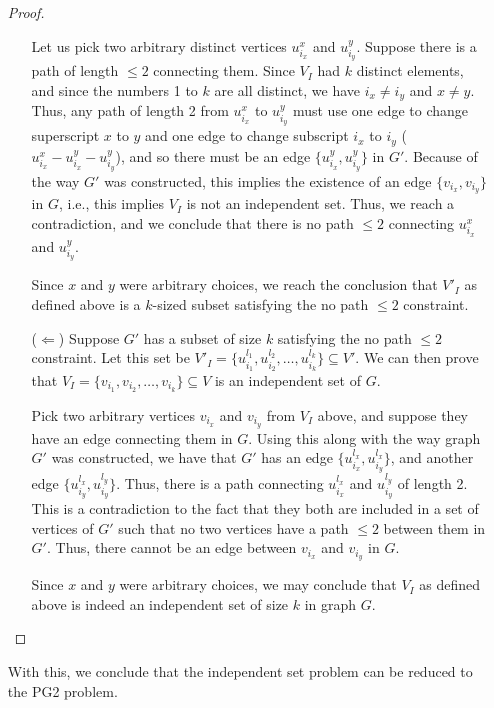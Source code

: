 \documentclass[11pt, fleqn]{article}
\begin{document}
\begin{itemize}
\begin{proof}
\begin{itemize}
            Let us pick two arbitrary distinct vertices $u_{i_x}^x$ and $u_{i_y}^y$. Suppose there is a path of length $\leq 2$ connecting them. Since $V_I$ had $k$ distinct elements, and since the numbers 1 to $k$ are all distinct, we have $i_x\neq i_y$ and $x\neq y$. Thus, any path of length 2 from $u_{i_x}^x$ to $u_{i_y}^y$ must use one edge to change superscript $x$ to $y$ and one edge to change subscript $i_x$ to $i_y$ ($u_{i_x}^x - u_{i_x}^y - u_{i_y}^y$), and so there must be an edge $\{u_{i_x}^y, u_{i_y}^y\}$ in $G'$. Because of the way $G'$ was constructed, this implies the existence of an edge $\{v_{i_x}, v_{i_y}\}$ in $G$, i.e., this implies $V_I$ is not an independent set. Thus, we reach a contradiction, and we conclude that there is no path $\leq 2$ connecting $u_{i_x}^x$ and $u_{i_y}^y$.
            
            Since $x$ and $y$ were arbitrary choices, we reach the conclusion that $V'_I$ as defined above is a $k$-sized subset satisfying the no path $\leq 2$ constraint.
            
            \item[($\Leftarrow$)]
            Suppose $G'$ has a subset of size $k$ satisfying the no path $\leq 2$ constraint. Let this set be $V'_I = \{u_{i_1}^{l_1} ,u_{i_2}^{l_2}, \dots, u_{i_k}^{l_k}\} \subseteq V'$. We can then prove that $V_I = \{v_{i_1}, v_{i_2}, \dots, v_{i_k}\} \subseteq V$ is an independent set of $G$.
            
            Pick two arbitrary vertices $v_{i_x}$ and $v_{i_y}$ from $V_I$ above, and suppose they have an edge connecting them in $G$. Using this along with the way graph $G'$ was constructed, we have that $G'$ has an edge $\{u_{i_x}^{l_x}, u_{i_y}^{l_x}\}$, and another edge $\{u_{i_y}^{l_x}, u_{i_y}^{l_y}\}$. Thus, there is a path connecting $u_{i_x}^{l_x}$ and $u_{i_y}^{l_y}$ of length 2. This is a contradiction to the fact that they both are included in a set of vertices of $G'$ such that no two vertices have a path $\leq 2$ between them in $G'$. Thus, there cannot be an edge between $v_{i_x}$ and $v_{i_y}$ in $G$.
            
            Since $x$ and $y$ were arbitrary choices, we may conclude that $V_I$ as defined above is indeed an independent set of size $k$ in graph $G$.
        \end{itemize}
    \end{proof}
    With this, we conclude that the independent set problem can be reduced to the PG2 problem.
\end{itemize}
\end{document}
